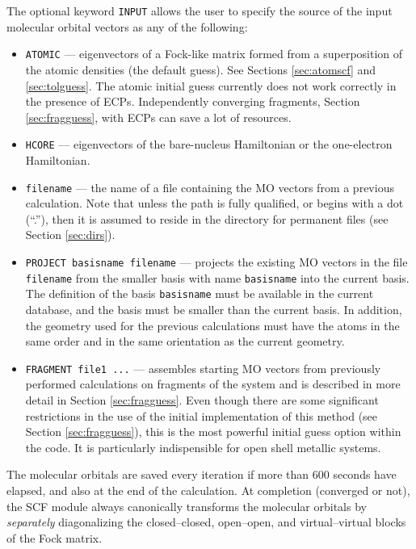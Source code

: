The optional keyword \verb+INPUT+ allows the user to specify the
source of the input molecular orbital vectors as any of the following:
\begin{itemize}
\item \verb+ATOMIC+ --- eigenvectors of a Fock-like matrix formed from
  a superposition of the atomic densities (the default guess).  See
  Sections \ref{sec:atomscf} and \ref{sec:tolguess}.  The atomic initial 
  guess currently does not work correctly in the presence of ECPs.  
  Independently converging fragments, Section \ref{sec:fragguess}, with 
  ECPs can save a lot of resources.
\item \verb+HCORE+ --- eigenvectors of the bare-nucleus Hamiltonian or
  the one-electron Hamiltonian.
\item \verb+filename+ --- the name of a file containing the MO vectors
  from a previous calculation.  Note that unless the path is fully
  qualified, or begins with a dot (``.''), then it is assumed to
  reside in the directory for permanent files (see Section
  \ref{sec:dirs}).
\item \verb+PROJECT basisname filename+ --- projects the existing MO
  vectors in the file \verb+filename+ from the smaller basis with name
  \verb+basisname+ into the current basis.  The definition of the
  basis \verb+basisname+ must be available in the current database,
  and the basis must be smaller than the current basis.  In addition,
  the geometry used for the previous calculations must have the atoms
  in the same order and in the same orientation as the current
  geometry.
\item \verb+FRAGMENT file1 ...+ --- assembles starting MO vectors from
  previously performed calculations on fragments of the system and is
  described in more detail in Section \ref{sec:fragguess}.  Even
  though there are some significant restrictions in the use of the
  initial implementation of this method (see Section
  \ref{sec:fragguess}), this is the most powerful initial guess option
  within the code.  It is particularly indispensible for open shell
  metallic systems.
\end{itemize}
 
The molecular orbitals are saved every iteration if more than 600
seconds have elapsed, and also at the end of the calculation.  At
completion (converged or not), the SCF module always canonically
transforms the molecular orbitals by {\em separately} diagonalizing
the closed--closed, open--open, and virtual--virtual blocks of the
Fock matrix.

